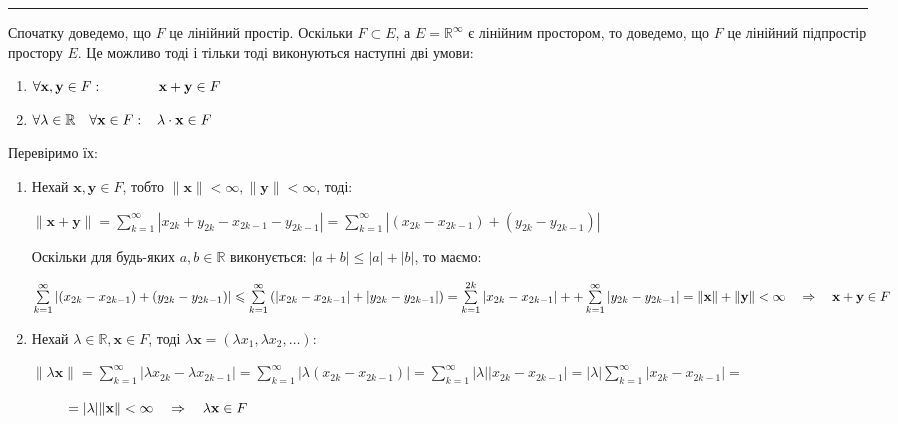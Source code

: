 \documentclass[a5paper, 20pt, titlepage]{article}
\newcommand{\x}{\textbf{x}}
\newcommand{\y}{\textbf{y}}
\begin{document}
\vspace{3mm}

\noindent\rule{4cm}{0.4pt}

Спочатку доведемо, що $F$ це лінійний простір. Оскільки $F \subset E$, а $E = \mathbb{R}^\infty$ є лінійним простором, то доведемо, що $F$ це лінійний підпростір простору $E$. Це можливо тоді і тільки тоді виконуються наступні дві умови:

\begin{enumerate}
\item $\forall \x, \y \in F: \hspace{14mm} \x + \y \in F$
\item $\forall \lambda \in \mathbb{R} \quad \forall \x \in F: \hspace{3mm} \lambda \cdot \x \in F$
\end{enumerate}

Перевіримо їх:

\begin{enumerate}
\item Нехай $\x, \y \in F$, тобто $\| \x \| < \infty, \| \y \| < \infty$, тоді:

$\| \x + \y \| = \sum \limits_{k=1}^{\infty} |x_{2k} + y_{2k} - x_{2k-1} - y_{2k-1}| = \sum \limits_{k=1}^{\infty} \left| (x_{2k} - x_{2k-1}) + (y_{2k} - y_{2k-1}) \right|$

Оскільки для будь-яких $a,b \in \mathbb{R}$ виконується: $|a+b| \leqslant |a| + |b|$, то маємо:

$\sum \limits_{k=1}^{\infty} \left| (x_{2k} - x_{2k-1}) + (y_{2k} - y_{2k-1}) \right| \leqslant \sum \limits_{k = 1}^{\infty} \left( |x_{2k} - x_{2k-1}| +
|y_{2k} - y_{2k-1}| \right) = \sum \limits_{k=1}^{2k} |x_{2k} - x_{2k-1}| + \linebreak + \sum \limits_{k=1}^{\infty} |y_{2k} - y_{2k-1}| = 
\| \x \| + \| \y \| < \infty \quad \Rightarrow \quad \x + \y \in F$

\item Нехай $\lambda \in \mathbb{R}, \x \in F$, тоді $\lambda \x = (\lambda x_1, \lambda x_2, \dots)$:

$\| \lambda \x \| = \sum \limits_{k=1}^{\infty} \left| \lambda x_{2k} - \lambda x_{2k-1} \right| = \sum \limits_{k=1}^{\infty} \left| \lambda(x_{2k} - x_{2k-1}) \right| = \sum \limits_{k=1}^{\infty} |\lambda| |x_{2k} - x_{2k-1}|  = |\lambda| \sum \limits_{k=1}^{\infty} |x_{2k} - x_{2k-1}| =$ \newline

\vspace{-5mm}

$\hspace{9mm} =  |\lambda| \| \x \| < \infty \quad \Rightarrow \quad \lambda \x \in F$


\end{enumerate}
\end{document}
